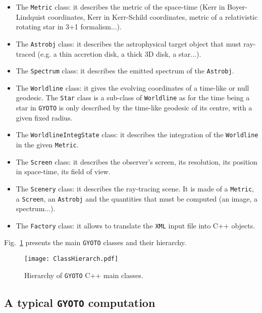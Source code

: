 \documentclass[a4paper,12pt]{article}
\begin{document}
\begin{itemize}
\item The \texttt{Metric} class: it describes the metric of the space-time (Kerr in Boyer-Lindquist coordinates, Kerr in Kerr-Schild coordinates, metric of a relativistic rotating star in 3+1 formalism...).
\item The \texttt{Astrobj} class: it describes the astrophysical target object that must ray-traced (e.g. a thin accretion disk, a thick 3D disk, a star...).
\item The \texttt{Spectrum} class: it describes the emitted spectrum of the \texttt{Astrobj}.
\item The \texttt{Worldline} class: it gives the evolving coordinates of a time-like or null geodesic. The \texttt{Star} class is a sub-class of \texttt{Worldline} as for the time being a star in \texttt{GYOTO} is only described by the time-like geodesic of its centre, with a given fixed radius.
\item The \texttt{WorldlineIntegState} class: it describes the integration of the \texttt{Worldline} in the given \texttt{Metric}.
\item The \texttt{Screen} class: it describes the observer's screen, its resolution, its position in space-time, its field of view.
\item The \texttt{Scenery} class: it describes the ray-tracing scene. It is made of a \texttt{Metric}, a \texttt{Screen}, an \texttt{Astrobj} and the quantities that must be computed (an image, a spectrum...).
\item The \texttt{Factory} class: it allows to translate the \texttt{XML} input file into C++ objects.
\end{itemize}

Fig.~\ref{fig:hierarch} presents the main \texttt{GYOTO} classes and their hierarchy.

\begin{figure}[htbp]
\centering
\texttt{[image: ClassHierarch.pdf]}
\caption{Hierarchy of \texttt{GYOTO} C++ main classes.}
\label{fig:hierarch}
\end{figure}

\subsection{A typical \texttt{GYOTO} computation}
\end{document}
